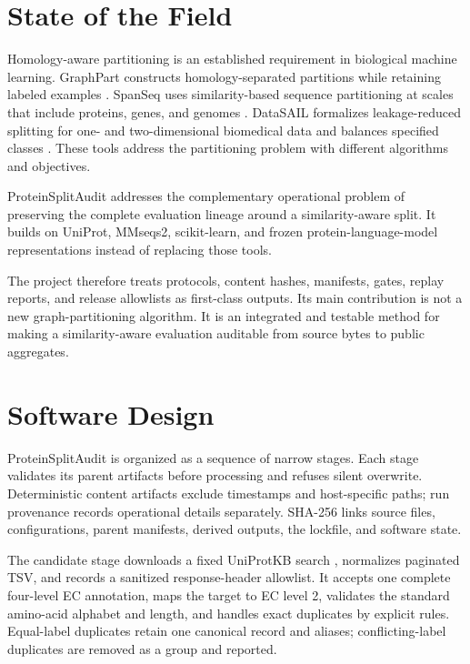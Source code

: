 \documentclass[11pt]{article}
\begin{document}
\section*{State of the Field}

Homology-aware partitioning is an established requirement in biological machine learning.
GraphPart constructs homology-separated partitions while retaining labeled examples
\citep{teufel2023graphpart}. SpanSeq uses similarity-based sequence partitioning at scales that
include proteins, genes, and genomes \citep{ferrerflorensa2024spanseq}. DataSAIL formalizes
leakage-reduced splitting for one- and two-dimensional biomedical data and balances specified
classes \citep{joeres2025datasail}. These tools address the partitioning problem with different
algorithms and objectives.

ProteinSplitAudit addresses the complementary operational problem of preserving the complete
evaluation lineage around a similarity-aware split. It builds on UniProt, MMseqs2, scikit-learn,
and frozen protein-language-model representations instead of replacing those tools.

The project therefore treats protocols, content hashes, manifests, gates, replay reports, and
release allowlists as first-class outputs. Its main contribution is not a new graph-partitioning
algorithm. It is an integrated and testable method for making a similarity-aware evaluation
auditable from source bytes to public aggregates.

\section*{Software Design}

ProteinSplitAudit is organized as a sequence of narrow stages. Each stage validates its parent
artifacts before processing and refuses silent overwrite. Deterministic content artifacts exclude
timestamps and host-specific paths; run provenance records operational details separately.
SHA-256 links source files, configurations, parent manifests, derived outputs, the lockfile, and
software state.

The candidate stage downloads a fixed UniProtKB search \citep{uniprot2025}, normalizes paginated
TSV, and records a sanitized response-header allowlist. It accepts one complete four-level EC
annotation, maps the target to EC level 2, validates the standard amino-acid alphabet and length,
and handles exact duplicates by explicit rules. Equal-label duplicates retain one canonical
record and aliases; conflicting-label duplicates are removed as a group and reported.
\end{document}
